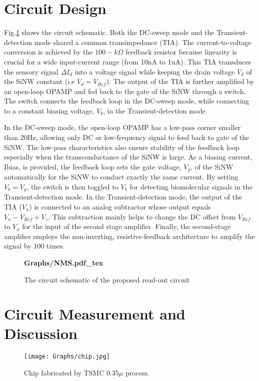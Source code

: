 \documentclass{article}
\begin{document}
\section{Circuit Design}
Fig.\ref{fig:NMS} shows the circuit schematic.
Both the DC-sweep mode and the Transient-detection mode shared a common transimpedance (TIA).
The current-to-voltage conversion is achieved by the $100-k\Omega$ feedback resistor because
linearity is crucial for a wide input-current range (from 10nA to 1uA).
This TIA transduces the sensory signal $\Delta I_{d}$ into a voltage signal
while keeping the drain voltage $V_d$ of the SiNW constant (i.e $V_d = V_{Ref}$).
The output of the TIA is further amplified by an open-loop OPAMP
and fed back to the gate of the SiNW through a switch.
The switch connects the feedback loop in the DC-sweep mode,
while connecting to a constant biasing voltage, $V_b$, in the Transient-detection mode.

In the DC-sweep mode, the open-loop OPAMP has a low-pass corner smaller than 20Hz,
allowing only DC or low-frequency signal to feed back to gate of the SiNW.
The low-pass characteristics also ensure stability of the feedback loop
especially when the transconductance of the SiNW is large.
As a biasing current, Ibias, is provided, the feedback loop sets the gate voltage, $V_g$, of the SiNW automatically
for the SiNW to conduct exactly the same current.
By setting $V_b=V_g$, the switch is then toggled to $V_b$ for detecting biomolecular signals in the Transient-detection mode.
In the Transient-detection mode,
the output of the TIA ($V_x$) is connected to an analog subtractor
whose output equals $V_x-V_{Ref}+V_z$.
This subtraction mainly helps to change the DC offset
from $V_{Ref}$ to $V_x$ for the input of the second stage amplifier.
Finally, the second-stage amplifier employs the non-inverting, resistive-feedback architecture
to amplify the signal by 100 times.

\begin{figure}
    \textbf{
        \centering
        \def\svgwidth{8.0cm}
        \fontsize{6}{15}\selectfont
         {Graphs/NMS.pdf_tex}
    }
    \caption{The circuit schematic of the proposed read-out circuit}
    \label{fig:NMS}
\end{figure}


\section{Circuit Measurement and Discussion}

\begin{figure}
        \centering
        \texttt{[image: Graphs/chip.jpg]}
    \caption{Chip fabricated by TSMC 0.35$\mu$ process.}
    \label{fig:chipphoto}
\end{figure}
\end{document}
